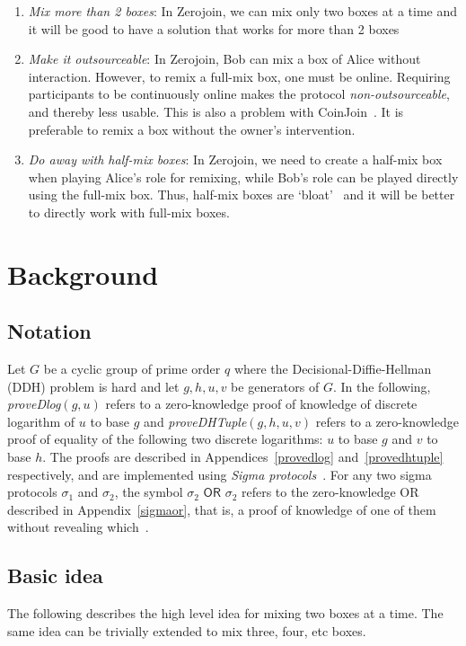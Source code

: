 \documentclass[runningheads]{llncs}
\newcommand{\zerojoin}{Zerojoin\xspace}
\begin{document}
\begin{enumerate}
    \item {\em Mix more than 2 boxes}: In \zerojoin, we can mix only two boxes at a time and it will be good to have a solution that works for more than 2 boxes
    \item {\em Make it outsourceable}: In \zerojoin, Bob can mix a box of Alice without interaction. However, to remix a full-mix box, one must be online. Requiring participants to be continuously online makes the protocol {\em non-outsourceable}, and thereby less usable. This is also a problem with CoinJoin~\cite{coinjoin}. It is preferable to remix a box without the owner's intervention. 
    \item {\em Do away with half-mix boxes}: In \zerojoin, we need to create a half-mix box when playing Alice's role for remixing, while Bob's role can be played directly using the full-mix box. Thus, half-mix boxes are `bloat'~\cite{zerojoin} and it will be better to directly work with full-mix boxes.
\end{enumerate} 

\section{Background}
\subsection{Notation}

Let $G$ be a cyclic group of prime order $q$ where the Decisional-Diffie-Hellman (DDH) problem is hard and let $g, h, u, v$ be generators of $G$. 
In the following, {\em proveDlog$(g, u)$} refers to a zero-knowledge proof of knowledge of discrete logarithm of $u$ to base $g$ and {\em proveDHTuple$(g, h, u, v)$} refers to a zero-knowledge proof of equality of the following two discrete logarithms: $u$ to base $g$ and $v$ to base $h$. The proofs are described in Appendices~\ref{provedlog} and~\ref{provedhtuple} respectively, and are implemented using {\em Sigma protocols}~\cite{zerojoin,CDS94}. 
For any two sigma protocols $\sigma_1$ and $\sigma_2$, the symbol $\sigma_2 \textsf{ OR } \sigma_2$ refers to the zero-knowledge OR described in Appendix~\ref{sigmaor}, that is, a proof of knowledge of one of them without revealing which~\cite{CDS94}. 

\subsection{Basic idea}
The following describes the high level idea for mixing two boxes at a time. The same idea can be trivially extended to mix three, four, etc boxes.
\end{document}
